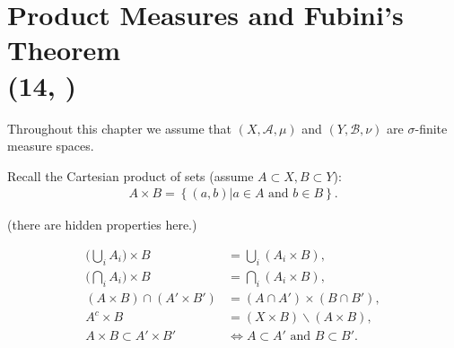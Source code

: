 \section{Product Measures and Fubini's Theorem \protect\\ \tiny{(14, \cite{schilling2017measures})}}
Throughout this chapter we assume that \((X,\mathscr{A},\mu)\) and \((Y,\mathscr{B}, \nu)\) are \(\sigma\)-finite measure spaces.

Recall the Cartesian product of sets (assume \(A\subset X, B\subset Y\)):
\begin{align*}
    A \times B = \left\{(a,b)|a\in A \text{ and } b\in B\right\}.
\end{align*}

\ifdetailed
\else
(there are hidden properties  here.)
\fi 

\ifdetailed 
\begin{align*}
    \bigl(\bigcup_i A_i\bigr) \times B &= \bigcup_i\left(A_i\times B\right), \\
    \bigl(\bigcap_i A_i\bigr) \times B &= \bigcap_i\left(A_i\times B\right), \\
    \left(A\times B\right) \cap \left(A'\times B'\right) &= \left(A\cap A'\right) \times \left(B\cap B'\right), \\
    A^c\times B &= \left(X\times B\right)\backslash \left(A\times B\right), \\
    A\times B \subset A'\times B' &\Longleftrightarrow A\subset A' \text{ and } B\subset B'.
\end{align*}
\fi 


